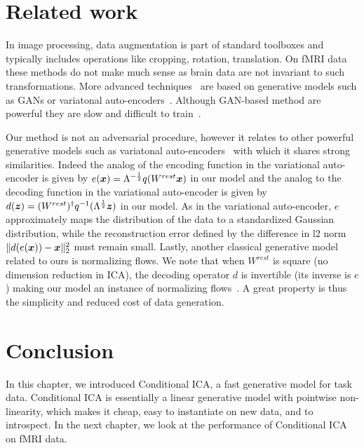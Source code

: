 \section{Related work}
In image processing, data augmentation is part of standard toolboxes and
typically includes operations like cropping, rotation, translation.
%
On fMRI data these methods do not make much sense as brain data are not invariant to such transformations.
%
More advanced techniques~\cite{zhuang2019fmri} %
are based on generative models such as GANs or variatonal
auto-encoders~\cite{kingma2013auto}. Although GAN-based method are powerful they are slow and difficult to train~\cite{arjovsky_wasserstein_2017}.

Our method is not an adversarial procedure, however it relates to other
powerful generative models such as variatonal
auto-encoders~\cite{kingma2013auto} with which it shares strong similarities.
Indeed the analog of the encoding function in the variational auto-encoder is
given by $e(\boldsymbol{x}) = \Lambda^{-\frac12}q(W^{rest} \boldsymbol{x})$ in our model and the analog to the decoding
function in the variational auto-encoder is given by $d(\boldsymbol{z}) =
(W^{rest})^{\dagger}q^{-1}(\Lambda^{\frac12}\boldsymbol{z})$ in our model. As in the variational auto-encoder, $e$ approximately maps the distribution of the data to a standardized Gaussian distribution,
while the reconstruction error defined by the difference in l2 norm
$\|d(e(\boldsymbol{x})) - \boldsymbol{x}\|^2_2$ must remain small.
Lastly, another classical generative model related to ours is normalizing
flows.  We note that when $W^{rest}$ is square (no dimension reduction in ICA), the decoding operator $d$ is invertible (its inverse is $e$) making our
model an instance of normalizing flows~\cite{rezende2015variational}. 
%
A great property is thus the simplicity and reduced cost of data generation.

\section{Conclusion}
In this chapter, we introduced Conditional ICA, a fast generative model for task
data.
Conditional ICA is essentially a linear generative model with
pointwise non-linearity, which makes it cheap, easy to instantiate on new data,
and to introspect.
In the next chapter, we look at the performance of Conditional ICA on fMRI data.

